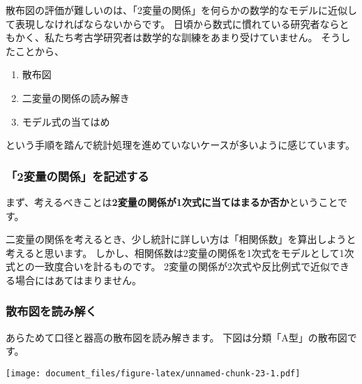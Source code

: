 \documentclass[]{article}
\newenvironment{Shaded}{\begin{snugshade}}{\end{snugshade}}
\newcommand{\DataTypeTok}[1]{\textcolor[rgb]{0.13,0.29,0.53}{#1}}
\newcommand{\KeywordTok}[1]{\textcolor[rgb]{0.13,0.29,0.53}{\textbf{#1}}}
\newcommand{\NormalTok}[1]{#1}
\newcommand{\OperatorTok}[1]{\textcolor[rgb]{0.81,0.36,0.00}{\textbf{#1}}}
\newcommand{\StringTok}[1]{\textcolor[rgb]{0.31,0.60,0.02}{#1}}
\providecommand{\tightlist}{%
  \setlength{\itemsep}{0pt}\setlength{\parskip}{0pt}}
\begin{document}
散布図の評価が難しいのは、「2変量の関係」を何らかの数学的なモデルに近似して表現しなければならないからです。
日頃から数式に慣れている研究者ならともかく、私たち考古学研究者は数学的な訓練をあまり受けていません。
そうしたことから、

\begin{enumerate}
\def\labelenumi{\arabic{enumi}.}
\tightlist
\item
  散布図
\item
  二変量の関係の読み解き
\item
  モデル式の当てはめ　
\end{enumerate}

という手順を踏んで統計処理を進めていないケースが多いように感じています。

\subsubsection{「2変量の関係」を記述する}

まず、考えるべきことは\textbf{2変量の関係が1次式に当てはまるか否か}ということです。

二変量の関係を考えるとき、少し統計に詳しい方は「相関係数」を算出しようと考えると思います。
しかし、相関係数は2変量の関係を1次式をモデルとして1次式との一致度合いを計るものです。
2変量の関係が2次式や反比例式で近似できる場合にはあてはまりません。

\subsubsection{散布図を読み解く}

あらためて口径と器高の散布図を読み解きます。
下図は分類「A型」の散布図です。

\begin{Shaded}
\end{Shaded}

\texttt{[image: document\_files/figure-latex/unnamed-chunk-23-1.pdf]}
\end{document}
